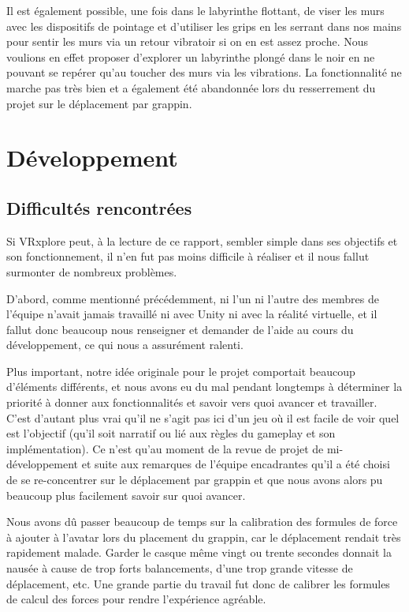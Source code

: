 \documentclass[a4paper]{elsarticle}
\begin{document}
Il est également possible, une fois dans le labyrinthe flottant, de viser les murs avec les dispositifs de pointage et d’utiliser les grips en les serrant dans nos mains pour sentir les murs via un retour vibratoir si on en est assez proche. Nous voulions en effet proposer d’explorer un labyrinthe plongé dans le noir en ne pouvant se repérer qu’au  \og toucher \fg{}  des murs via les vibrations. La fonctionnalité ne marche pas très bien et a également été abandonnée lors du resserrement du projet sur le déplacement par grappin.

\section{Développement}

\subsection{Difficultés rencontrées}

Si VRxplore peut, à la lecture de ce rapport, sembler simple dans ses objectifs et son fonctionnement, il n’en fut pas moins difficile à réaliser et il nous fallut surmonter de nombreux problèmes.

D’abord, comme mentionné précédemment, ni l’un ni l’autre des membres de l’équipe n’avait jamais travaillé ni avec Unity ni avec la réalité virtuelle, et il fallut donc beaucoup nous renseigner et demander de l’aide au cours du développement, ce qui nous a assurément ralenti.

Plus important, notre idée originale pour le projet comportait beaucoup d’éléments différents, et nous avons eu du mal pendant longtemps à déterminer la priorité à donner aux fonctionnalités et savoir vers quoi avancer et travailler. C’est d’autant plus vrai qu’il ne s’agit pas ici d’un jeu où il est facile de voir quel est l’objectif (qu’il soit narratif ou lié aux règles du gameplay et son implémentation). Ce n’est qu’au moment de la revue de projet de mi-développement et suite aux remarques de l’équipe encadrantes qu’il a été choisi de se re-concentrer sur le déplacement par grappin et que nous avons alors pu beaucoup plus facilement savoir sur quoi avancer.

Nous avons dû passer beaucoup de temps sur la calibration des formules de force à ajouter à l’avatar lors du placement du grappin, car le déplacement rendait très rapidement malade. Garder le casque même vingt ou trente secondes donnait la nausée à cause de trop forts balancements, d’une trop grande vitesse de déplacement, etc. Une grande partie du travail fut donc de calibrer les formules de calcul des forces pour rendre l’expérience agréable.
\end{document}
